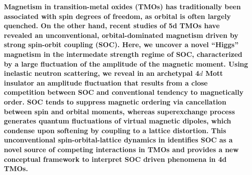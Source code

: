 \maketitle
\noindent
{\bf 
Magnetism in transition-metal oxides (TMOs) has traditionally been associated with spin degrees of freedom, as orbital is often largely quenched. On the other hand, recent studies of 5d TMOs have revealed an unconventional, orbital-dominated magnetism driven by strong spin-orbit coupling (SOC). Here, we uncover a novel ``Higgs'' magnetism in the intermedate strength regime of SOC, characterized by a large fluctuation of the amplitude of the magnetic moment. Using inelastic neutron scattering, we reveal in an archetypal 4$d$ Mott insulator \CRO an amplitude fluctuation that results from a close competition between SOC and conventional tendency to magnetically order. SOC tends to suppress magnetic ordering via cancellation between spin and orbital moments, whereas superexchange process generates quantum fluctuations of virtual magnetic dipoles, which condense upon softening by coupling to a lattice distortion. This unconventional spin-orbital-lattice dynamics in \CRO identifies SOC as a novel source of competing interactions in TMOs and provides a new conceptual framework to interpret SOC driven phenomena in 4d TMOs.
}
  
  
  